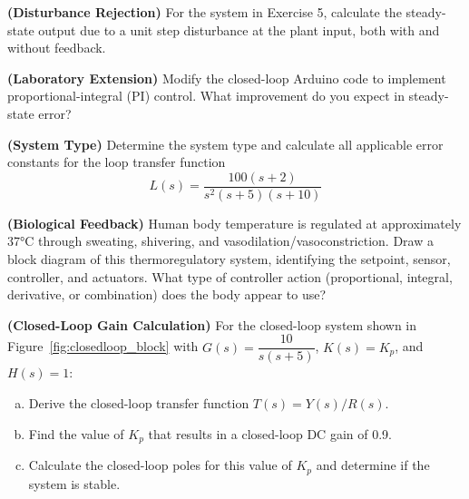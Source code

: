 \begin{exercise}
\textbf{(Disturbance Rejection)} For the system in Exercise 5, calculate the steady-state output due to a unit step disturbance at the plant input, both with and without feedback.
\end{exercise}

\begin{exercise}
\textbf{(Laboratory Extension)} Modify the closed-loop Arduino code to implement proportional-integral (PI) control. What improvement do you expect in steady-state error?
\end{exercise}

\begin{exercise}
\textbf{(System Type)} Determine the system type and calculate all applicable error constants for the loop transfer function
\begin{equation*}
L(s) = \frac{100(s+2)}{s^2(s+5)(s+10)}
\end{equation*}
\end{exercise}

\begin{exercise}
\textbf{(Biological Feedback)} Human body temperature is regulated at approximately 37°C through sweating, shivering, and vasodilation/vasoconstriction. Draw a block diagram of this thermoregulatory system, identifying the setpoint, sensor, controller, and actuators. What type of controller action (proportional, integral, derivative, or combination) does the body appear to use?
\end{exercise}

\begin{exercise}
\textbf{(Closed-Loop Gain Calculation)} For the closed-loop system shown in Figure~\ref{fig:closedloop_block} with $G(s) = \dfrac{10}{s(s+5)}$, $K(s) = K_p$, and $H(s) = 1$:
\begin{enumerate}[(a)]
\item Derive the closed-loop transfer function $T(s) = Y(s)/R(s)$.
\item Find the value of $K_p$ that results in a closed-loop DC gain of 0.9.
\item Calculate the closed-loop poles for this value of $K_p$ and determine if the system is stable.
\end{enumerate}
\end{exercise}

